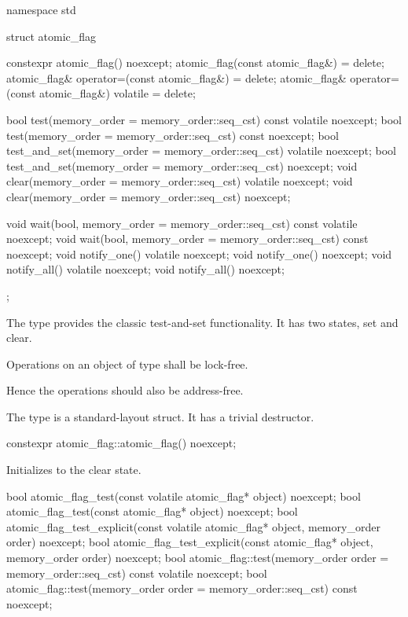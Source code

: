 \begin{codeblock}
namespace std {
  struct atomic_flag {
    constexpr atomic_flag() noexcept;
    atomic_flag(const atomic_flag&) = delete;
    atomic_flag& operator=(const atomic_flag&) = delete;
    atomic_flag& operator=(const atomic_flag&) volatile = delete;

    bool test(memory_order = memory_order::seq_cst) const volatile noexcept;
    bool test(memory_order = memory_order::seq_cst) const noexcept;
    bool test_and_set(memory_order = memory_order::seq_cst) volatile noexcept;
    bool test_and_set(memory_order = memory_order::seq_cst) noexcept;
    void clear(memory_order = memory_order::seq_cst) volatile noexcept;
    void clear(memory_order = memory_order::seq_cst) noexcept;

    void wait(bool, memory_order = memory_order::seq_cst) const volatile noexcept;
    void wait(bool, memory_order = memory_order::seq_cst) const noexcept;
    void notify_one() volatile noexcept;
    void notify_one() noexcept;
    void notify_all() volatile noexcept;
    void notify_all() noexcept;
  };
}
\end{codeblock}

\pnum
The  type provides the classic test-and-set functionality. It has two states, set and clear.

\pnum
Operations on an object of type  shall be lock-free.
\begin{note}
Hence
the operations should also be address-free.
\end{note}

\pnum
The  type is a standard-layout struct.
It has a trivial destructor.

%
\begin{itemdecl}
constexpr atomic_flag::atomic_flag() noexcept;
\end{itemdecl}

\begin{itemdescr}
\pnum
\effects
Initializes  to the clear state.
\end{itemdescr}

%
%
%
\begin{itemdecl}
bool atomic_flag_test(const volatile atomic_flag* object) noexcept;
bool atomic_flag_test(const atomic_flag* object) noexcept;
bool atomic_flag_test_explicit(const volatile atomic_flag* object,
                               memory_order order) noexcept;
bool atomic_flag_test_explicit(const atomic_flag* object,
                               memory_order order) noexcept;
bool atomic_flag::test(memory_order order = memory_order::seq_cst) const volatile noexcept;
bool atomic_flag::test(memory_order order = memory_order::seq_cst) const noexcept;
\end{itemdecl}

